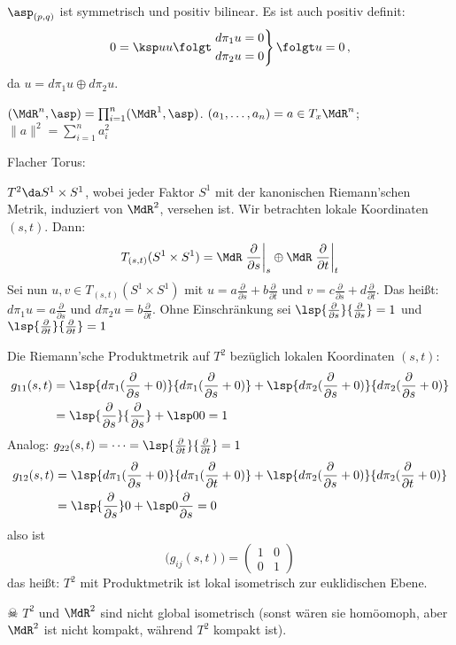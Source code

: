 \documentclass[a4paper,twoside,DIV15,BCOR12mm]{scrbook}
\begin{document}
$\asp_{(p,q)}$ ist symmetrisch und positiv bilinear. Es ist auch positiv definit:
\[
0 = \ksp uu \folgt 
\left.\begin{aligned}
d\pi_1 u = 0 \\
d\pi_2 u = 0
\end{aligned}\right\} \folgt u=0\,,
\]
da $u=d\pi_1u \oplus d\pi_2 u$.

\begin{beispiele}
\item $(\MdR^n,\asp) = \prod_{i=1}^n (\MdR^1,\asp)$. $(a_1,\ldots,a_n) = a \in T_x\MdR^n$; $\|a\|^2 = \sum_{i=1}^n a_i^2$
\item Flacher Torus:

$T^2 \da S^1 \times S^1$, wobei jeder Faktor $S^1$ mit der kanonischen Riemann’schen Metrik, induziert von $\MdR^2$, versehen ist. Wir betrachten lokale Koordinaten $(s,t)$. Dann:
\[
T_{(s,t)}(S^1\times S^1) = \MdR \left.\frac{\partial}{\partial s}\right|_s \oplus \MdR \left.\frac{\partial}{\partial t}\right|_t
\]
Sei nun $u,v\in T_{(s,t)}(S^1\times S^1)$ mit $u=a \frac\partial{\partial s} + b \frac\partial{\partial t}$ und $v=c \frac\partial{\partial s} + d \frac\partial{\partial t}$. Das heißt: $d\pi_1 u = a \frac\partial{\partial s}$ und $d\pi_2 u = b \frac\partial{\partial t}$.  
Ohne Einschränkung sei $\lsp {\frac\partial{\partial s}} {\frac\partial{\partial s}} = 1$ und $\lsp {\frac\partial{\partial t}} {\frac\partial{\partial t}} = 1$

Die Riemann’sche Produktmetrik auf $T^2$ bezüglich lokalen Koordinaten $(s,t)$:
\begin{align*}
g_{11}(s,t) &= \lsp {d\pi_1 ({\frac\partial{\partial s}} + 0)}{d\pi_1 ({\frac\partial{\partial s}} + 0)} + \lsp {d\pi_2 ({\frac\partial{\partial s}} + 0)}{d\pi_2 ({\frac\partial{\partial s}} + 0)} \\
&= \lsp {\frac\partial{\partial s}}{\frac\partial{\partial s}} + \lsp 0 0 = 1
\end{align*}
Analog: $g_{22}(s,t) = \cdots = \lsp {\frac\partial{\partial t}} {\frac\partial{\partial t}} = 1$
\begin{align*}
g_{12}(s,t) &= \lsp {d\pi_1 ({\frac\partial{\partial s}} + 0)}{d\pi_1 ({\frac\partial{\partial t}} + 0)} + \lsp {d\pi_2 ({\frac\partial{\partial s}} + 0)}{d\pi_2 ({\frac\partial{\partial t}} + 0)} \\
&= \lsp {\frac\partial{\partial s}}0 + \lsp 0 {\frac\partial{\partial s}} = 0
\end{align*}
also ist
\[
\Big( g_{ij}(s,t) \Big) = 
\begin{pmatrix}
1 & 0 \\ 0 & 1
\end{pmatrix}
\]
das heißt: $T^2$ mit Produktmetrik ist lokal isometrisch zur euklidischen Ebene. 

$\skull$ $T^2$ und $\MdR^2$ sind nicht global isometrisch (sonst wären sie homöomoph, aber $\MdR^2$ ist nicht kompakt, während $T^2$ kompakt ist).


\end{beispiele}
\end{document}
